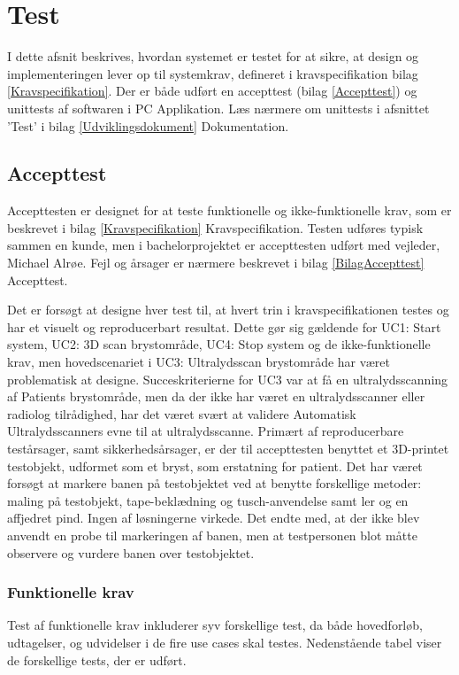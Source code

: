\chapter{Test}\label{Test}
I dette afsnit beskrives, hvordan systemet er testet for at sikre, at design og implementeringen lever op til systemkrav, defineret i kravspecifikation bilag \ref{Kravspecifikation}. Der er både udført en accepttest (bilag \ref{Accepttest}) og unittests af softwaren i PC Applikation. Læs nærmere om unittests i afsnittet 'Test' i bilag \ref{Udviklingsdokument} Dokumentation.

\section{Accepttest}

Accepttesten er designet for at teste funktionelle og ikke-funktionelle krav, som er beskrevet i bilag \ref{Kravspecifikation} Kravspecifikation. Testen udføres typisk sammen en kunde, men i bachelorprojektet er accepttesten udført med vejleder, Michael Alrøe.  Fejl og årsager er nærmere beskrevet i bilag \ref{BilagAccepttest} Accepttest.  

Det er forsøgt at designe hver test til, at hvert trin i kravspecifikationen testes og har et visuelt og reproducerbart resultat. Dette gør sig gældende for UC1: Start system, UC2: 3D scan brystområde, UC4: Stop system og de ikke-funktionelle krav, men hovedscenariet i UC3: Ultralydsscan brystområde har været problematisk at designe. Succeskriterierne for UC3 var at få en ultralydsscanning af Patients brystområde, men da der ikke har været en ultralydsscanner eller radiolog tilrådighed, har det været svært at validere Automatisk Ultralydsscanners evne til at ultralydsscanne. Primært af reproducerbare testårsager, samt sikkerhedsårsager, er der til accepttesten benyttet et 3D-printet testobjekt, udformet som et bryst, som erstatning for patient. Det har været forsøgt at markere banen på testobjektet ved at benytte forskellige metoder: maling på testobjekt, tape-beklædning og tusch-anvendelse samt ler og en affjedret pind. Ingen af løsningerne virkede. Det endte med, at der ikke blev anvendt en probe til markeringen af banen, men at testpersonen blot måtte observere og vurdere banen over testobjektet. 
\newpage
\subsection{Funktionelle krav} 
Test af funktionelle krav inkluderer syv forskellige test, da både hovedforløb, udtagelser, og udvidelser i de fire use cases skal testes. Nedenstående tabel viser de forskellige tests, der er udført. 

